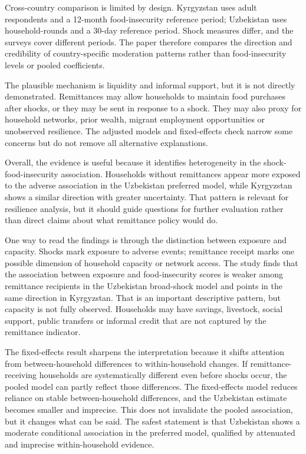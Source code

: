 \documentclass[11pt]{article}
\begin{document}
Cross-country comparison is limited by design. Kyrgyzstan uses adult respondents and a 12-month food-insecurity reference period; Uzbekistan uses household-rounds and a 30-day reference period. Shock measures differ, and the surveys cover different periods. The paper therefore compares the direction and credibility of country-specific moderation patterns rather than food-insecurity levels or pooled coefficients.

The plausible mechanism is liquidity and informal support, but it is not directly demonstrated. Remittances may allow households to maintain food purchases after shocks, or they may be sent in response to a shock. They may also proxy for household networks, prior wealth, migrant employment opportunities or unobserved resilience. The adjusted models and fixed-effects check narrow some concerns but do not remove all alternative explanations.

Overall, the evidence is useful because it identifies heterogeneity in the shock-food-insecurity association. Households without remittances appear more exposed to the adverse association in the Uzbekistan preferred model, while Kyrgyzstan shows a similar direction with greater uncertainty. That pattern is relevant for resilience analysis, but it should guide questions for further evaluation rather than direct claims about what remittance policy would do.

One way to read the findings is through the distinction between exposure and capacity. Shocks mark exposure to adverse events; remittance receipt marks one possible dimension of household capacity or network access. The study finds that the association between exposure and food-insecurity scores is weaker among remittance recipients in the Uzbekistan broad-shock model and points in the same direction in Kyrgyzstan. That is an important descriptive pattern, but capacity is not fully observed. Households may have savings, livestock, social support, public transfers or informal credit that are not captured by the remittance indicator.

The fixed-effects result sharpens the interpretation because it shifts attention from between-household differences to within-household changes. If remittance-receiving households are systematically different even before shocks occur, the pooled model can partly reflect those differences. The fixed-effects model reduces reliance on stable between-household differences, and the Uzbekistan estimate becomes smaller and imprecise. This does not invalidate the pooled association, but it changes what can be said. The safest statement is that Uzbekistan shows a moderate conditional association in the preferred model, qualified by attenuated and imprecise within-household evidence.
\end{document}
